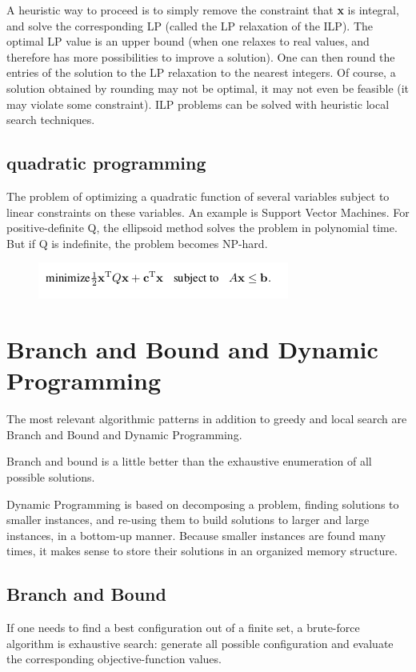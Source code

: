 \documentclass[10pt]{article}
\begin{document}
A heuristic way to proceed is to simply remove the constraint that \textbf{x} is integral, and solve the corresponding LP (called the LP relaxation of the ILP). The optimal LP value is an upper bound (when one relaxes to real values, and therefore has more possibilities to improve a solution). One can then round the entries of the solution to the LP relaxation to the nearest integers. Of course, a solution obtained
by rounding may not be optimal, it may not even be feasible (it may violate some constraint). ILP problems can be solved with heuristic local search techniques.

\subsection{quadratic programming}
The problem of optimizing a quadratic function of several variables subject to linear constraints on these variables. An example is Support Vector Machines.
For positive-definite Q, the ellipsoid method solves the problem in polynomial time. But if Q is indefinite, the problem
becomes NP-hard.

\begin{figure}[H]
\includegraphics[scale=0.60]{qp}
\centering
\end{figure}

\section{Branch and Bound and Dynamic Programming}
The most relevant algorithmic patterns in addition to greedy and local search are Branch and Bound and Dynamic Programming.

Branch and bound is a little better than the exhaustive enumeration of all possible solutions.

Dynamic Programming is based on decomposing a problem, finding solutions to smaller instances, and re-using them to build solutions to larger and large instances, in a bottom-up manner. Because smaller instances are found many times, it makes sense to store their solutions in an organized memory structure.

\subsection{Branch and Bound}
If one needs to find a best configuration out of a finite set, a brute-force algorithm is exhaustive search: generate all possible configuration and evaluate the corresponding objective-function values.
\end{document}
